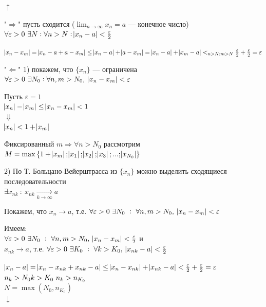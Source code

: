 \documentclass{article}
\begin{document}
    \(\uparrow\)
    
    "\(\Rightarrow\)" пусть сходится (\(\lim_{n \rightarrow \infty}{x_n} = a\) --- конечное число) \(\forall \varepsilon > 0\ \exists N : \forall n > N: \abs{x_n - a} < \frac{\varepsilon}{2} \)

    \( \abs{x_n - x_m} = \abs{x_n - a + a - x_m} \leq \abs{x_n - a} + \abs{a - x_m} = \abs{x_n - a} + \abs{x_m - a} <_{n > N; m > N} \frac{\varepsilon}{2} + \frac{\varepsilon}{2} = \varepsilon \)

    "\(\Leftarrow\)" 1) покажем, что \(\{x_n\}\) --- ограничена \(\forall \varepsilon > 0\ \exists N_0 : \forall n,m > N_0,\ \abs{x_n - x_m} < \varepsilon\)
    
    Пусть \(\varepsilon = 1\)
    \\\(\abs{x_n} - \abs{x_m} \leq \abs{x_n - x_m} < 1\)
    \\\( \Downarrow \)
    \\\( \abs{x_n} < 1 + \abs{x_m} \)

    Фиксированный \( m \Rightarrow \forall n > N_0 \) рассмотрим \( M = \max{\{ 1 + \abs{x_m}; \abs{x_1}; \abs{x_2}; \abs{x_3}; ... ; \abs{x_{N_0}} \}} \)
    
    2) По Т. Больцано-Вейерштрасса из \(\{x_n\}\) можно выделить сходящиеся последовательности
    \\\(\exists x_{nk}\ :\ x_{nk} \xrightarrow[k \rightarrow \infty]{} a \)
    
	Покажем, что \( x_n \rightarrow a \), т.е. \(\forall \varepsilon > 0\ \exists N_0\ :\ \forall n, m > N_0,\ \abs{x_n - x_m} < \varepsilon \)

    Имеем:\\
    \(\forall \varepsilon > 0\ \exists N_0\ :\ \forall n, m > N_0,\ \abs{x_n - x_m} < \frac{\varepsilon}{2}\) и\\
    \(x_{nk} \rightarrow a\), т.е. \(\forall \varepsilon > 0\ \exists K_0\ :\ \forall k > K_0,\ \abs{x_{nk} - a} < \frac{\varepsilon}{2}\)

    \(\abs{x_n - a} = \abs{x_n - x_{nk} + x_{nk} - a} \leq \abs{x_n - x_{nk}} + \abs{x_{nk} - a} < \frac{\varepsilon}{2} + \frac{\varepsilon}{2} = \varepsilon\)
    \\ \(n_k > N_0\\ k > K_0\ n_k > n_{K_0}\)
    \\\(N = \max(N_0, n_{K_0})\)
    \\\(\downarrow\)
    
\end{document}
